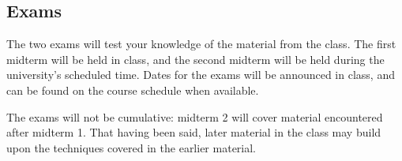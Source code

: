 \documentclass[12pt]{scrartcl}
\begin{document}
\subsection{Exams}
The two exams will test your knowledge of the material from the class. 
The first midterm will be held in class, and the second midterm will be held during the university’s scheduled time. 
Dates for the exams will be announced in class, and can be found on the course schedule when available.

The exams will not be cumulative: midterm 2 will cover material encountered after midterm 1. 
That having been said, later material in the class may build upon the techniques covered in the earlier material.







\end{document}
